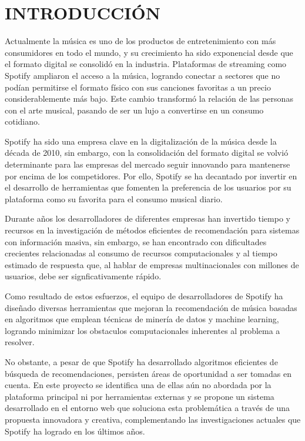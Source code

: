\chapter*{INTRODUCCIÓN}


\setlength{\parindent}{0pt}      
\setlength{\parskip}{1em}

Actualmente la música es uno de los productos de entretenimiento con más consumidores en todo el mundo, y su crecimiento ha sido exponencial desde que el formato digital se consolidó en la industria. Plataformas de streaming como Spotify ampliaron el acceso a la música, logrando conectar a sectores que no podían permitirse el formato físico con sus canciones favoritas a un precio considerablemente más bajo. Este cambio transformó la relación de las personas con el arte musical, pasando de ser un lujo a convertirse en un consumo cotidiano.

Spotify ha sido una empresa clave en la digitalización de la música desde la década de 2010, sin embargo, con la consolidación del formato digital se volvió determinante para las empresas del mercado seguir innovando para mantenerse por encima de los competidores.
Por ello, Spotify se ha decantado por invertir en el desarrollo de herramientas que fomenten la preferencia de los usuarios por su plataforma como su favorita para el consumo musical diario.


Durante años los desarrolladores de diferentes empresas han invertido tiempo y recursos en la investigación de métodos eficientes de recomendación para sistemas con información masiva, sin embargo, se han encontrado con dificultades crecientes relacionadas al consumo de recursos computacionales y al tiempo estimado de respuesta que, al hablar de empresas multinacionales con millones de usuarios, debe ser signficativamente rápido.


Como resultado de estos esfuerzos, el equipo de desarrolladores de Spotify ha diseñado diversas herramientas que mejoran la recomendación de música basadas en algoritmos que emplean técnicas de minería de datos y machine learning, logrando minimizar los obstaculos computacionales inherentes al problema a resolver.

No obstante, a pesar de que Spotify ha desarrollado algoritmos eficientes de búsqueda de recomendaciones, persisten áreas de oportunidad a ser tomadas en cuenta. En este proyecto se identifica una de ellas aún no abordada por la plataforma principal ni por herramientas externas y se propone un sistema desarrollado en el entorno web que soluciona esta problemática a través de una propuesta innovadora y creativa, complementando las investigaciones actuales que Spotify ha logrado en los últimos años.

